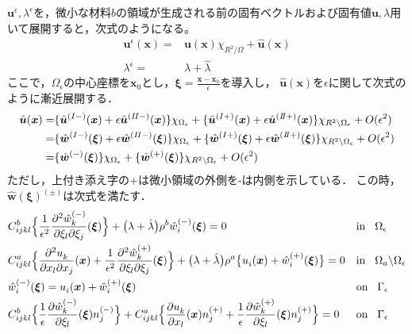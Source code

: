 $\bm{u}^{\epsilon},\lambda^{\epsilon}$を，微小な材料$b$の領域が生成される前の固有ベクトルおよび固有値$\bm{u},\lambda$用いて展開すると，次式のようになる。
\begin{align}
	\bm{u}^{\epsilon}(\bm{x})=&\bm{u}(\bm{x})\chi_{R^2/\Omega}+\hat{\bm{u}}(\bm{x})
	\\
	\lambda^{\epsilon}=&\lambda+\hat{\lambda}
\end{align}
ここで，$\Omega_\epsilon$の中心座標を$\bm{x}_0$とし，$\bm{\xi}=\frac{\bm{x}-\bm{x}_0}{\epsilon}$を導入し，
$\hat{\bm{u}}(\bm{x})$を$\epsilon$に関して次式のように漸近展開する．
\begin{align}
	\hat{\bm{u}}(\bm{x})
	=&\{\hat{\bm{u}}^{(I-)}(\bm{x})+\epsilon\hat{\bm{u}}^{(I\hspace{-.1em}I-)}(\bm{x})\}\chi_{\Omega_\epsilon}
	+\{\hat{\bm{u}}^{(I+)}(\bm{x})+\epsilon\hat{\bm{u}}^{(I\hspace{-.2em}I+)}(\bm{x})\}\chi_{R^2\backslash\Omega_\epsilon}+O(\epsilon^2)
	\nonumber
	\\
	=&\{\hat{\bm{w}}^{(I-)}(\bm{\xi})+\epsilon\hat{\bm{w}}^{(I\hspace{-.1em}I-)}(\bm{\xi})\}\chi_{\Omega_\epsilon}
	+\{\hat{\bm{w}}^{(I+)}(\bm{\xi})+\epsilon\hat{\bm{w}}^{(I\hspace{-.2em}I+)}(\bm{\xi})\}\chi_{R^2\backslash\Omega_\epsilon}+O(\epsilon^2)
	\nonumber
	\\
	=&\{\hat{\bm{w}}^{(-)}(\bm{\xi})\}\chi_{\Omega_\epsilon}
	+\{\hat{\bm{w}}^{(+)}(\bm{\xi})\}\chi_{R^2\backslash\Omega_\epsilon}+O(\epsilon^2)
\end{align}
ただし，上付き添え字の+は微小領域の外側を-は内側を示している．
この時，$\hat{\bm{w}}(\bm{\xi})^{(\pm)}$は次式を満たす．
\begin{align}
	&C_{ijkl}^{b} \Bigl \{ \frac{1}{\epsilon^2}\frac{\partial^2 \hat{w}^{(-)}_{k}} {\partial \xi_l \partial \xi_j}(\bm{\xi})\Bigr \}
	+\bigl( \lambda+\hat{\lambda}\bigr) \rho^{b} 
	 \hat{w}_{i}^{(-)}(\bm{\xi})=0
	&&\text{in}\hspace{0.3cm}\Omega_{\epsilon}
	\label{eq:GovEpsIn}
	\\
	&C_{ijkl}^{a} \Bigl \{ \frac{\partial^2 u^{}_{k}} {\partial x_l \partial x_j}(\bm{x})
	+\frac{1}{\epsilon^2}\frac{\partial^2 \hat{w}^{(+)}_{k}} {\partial \xi_l \partial \xi_j}(\bm{\xi})\Bigr \}
	+\bigl( \lambda+\hat{\lambda}\bigr) \rho^{a}
	\bigl \{ u_{i}^{}(\bm{x})+\hat{w}_{i}^{(+)}(\bm{\xi})\bigr \}=0
	&&\text{in}\hspace{0.3cm}\Omega_{a}\backslash\Omega_{\epsilon}
	\label{eq:GovEpsOut}
	\\
	&\hat{w}_{i}^{(-)}(\bm{\xi})=u_{i}^{}(\bm{x})+\hat{w}_{i}^{(+)}(\bm{\xi})
	&&\text{on}\hspace{0.3cm}\Gamma_{\epsilon}
	\\
	&C_{ijkl}^{b} \Bigl \{ \frac{1}{\epsilon}\frac{\partial \hat{w}^{(-)}_{k}} {\partial \xi_l}(\bm{\xi}) n_{j}^{(-)} \Bigr \}
	+C_{ijkl}^{a} \Bigl \{ \frac{\partial u^{}_{k}} {\partial x_l}(\bm{x})n_{j}^{(+)}
	+\frac{1}{\epsilon}\frac{\partial \hat{w}^{(+)}_{k}} {\partial \xi_l}(\bm{\xi}) n_{j}^{(+)} \Bigr \}
	=0
	&&\text{on}\hspace{0.3cm}\Gamma_{\epsilon}
	\label{eq:GovEpsBC}
\end{align}
